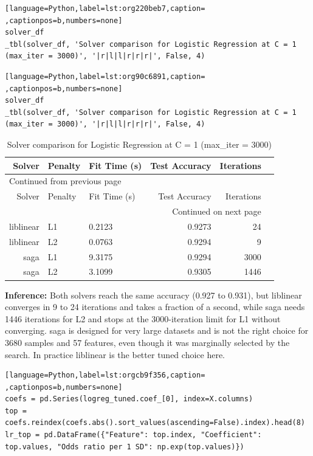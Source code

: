 \documentclass[11pt]{article}
\begin{document}
\begin{lstlisting}[language=Python,label=lst:org220beb7,caption= ,captionpos=b,numbers=none]
solver_df
_tbl(solver_df, 'Solver comparison for Logistic Regression at C = 1 (max_iter = 3000)', '|r|l|l|r|r|r|', False, 4)
\end{lstlisting}
\begin{lstlisting}[language=Python,label=lst:org90c6891,caption= ,captionpos=b,numbers=none]
solver_df
_tbl(solver_df, 'Solver comparison for Logistic Regression at C = 1 (max_iter = 3000)', '|r|l|l|r|r|r|', False, 4)
\end{lstlisting}

\begin{longtable}{|r|l|l|r|r|r|}
\caption{Solver comparison for Logistic Regression at C = 1 (max\_iter = 3000)}
\\[0pt]
\hline
Solver & Penalty & Fit Time (s) & Test Accuracy & Iterations\\[0pt]
\hline
\endfirsthead
\multicolumn{5}{l}{Continued from previous page} \\[0pt]
\hline

Solver & Penalty & Fit Time (s) & Test Accuracy & Iterations \\[0pt]

\hline
\endhead
\hline\multicolumn{5}{r}{Continued on next page} \\
\endfoot
\endlastfoot
\hline
liblinear & L1 & 0.2123 & 0.9273 & 24\\[0pt]
\hline
liblinear & L2 & 0.0763 & 0.9294 & 9\\[0pt]
\hline
saga & L1 & 9.3175 & 0.9294 & 3000\\[0pt]
\hline
saga & L2 & 3.1099 & 0.9305 & 1446\\[0pt]
\hline
\end{longtable}

\textbf{Inference:} Both solvers reach the same accuracy (0.927 to 0.931), but liblinear converges in 9 to 24
iterations and takes a fraction of a second, while saga needs 1446 iterations for L2 and
stops at the 3000-iteration limit for L1 without converging. saga is designed for very large
datasets and is not the right choice for 3680 samples and 57 features, even though it was
marginally selected by the search. In practice liblinear is the better tuned choice here.
\begin{lstlisting}[language=Python,label=lst:orgcb9f356,caption= ,captionpos=b,numbers=none]
coefs = pd.Series(logreg_tuned.coef_[0], index=X.columns)
top = coefs.reindex(coefs.abs().sort_values(ascending=False).index).head(8)
lr_top = pd.DataFrame({"Feature": top.index, "Coefficient": top.values, "Odds ratio per 1 SD": np.exp(top.values)})
\end{lstlisting}
\end{document}
